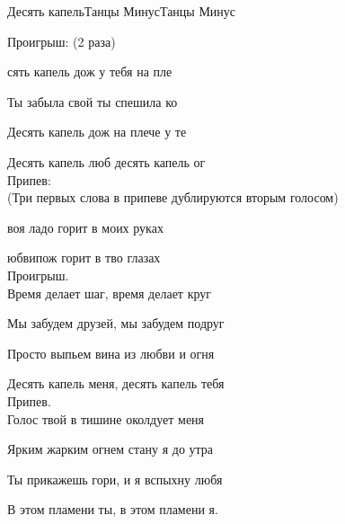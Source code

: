 \documentclass[11pt,a5paper]{book}
\begin{document}
\begin{song}{Десять капель}{}{Танцы Минус}{Танцы Минус}{}{}

Проигрыш: (2 раза)\par 
{}       

сять капель дож у тебя на пле\par
Ты забыла свой  ты спешила ко \par
Десять капель дож на плече у те\par
Десять капель люб десять капель ог\\

Припев:\\(Три первых слова в припеве дублируются вторым голосом)\par
{}воя ладо горит в моих руках\par
{}юбвипож горит в тво глазах\\

Проигрыш.\\

Время делает шаг, время делает круг\par
Мы забудем друзей, мы забудем подруг\par
Просто выпьем вина из любви и огня\par
Десять капель меня, десять капель тебя\\

Припев.\\

Голос твой в тишине околдует меня\par
Ярким жарким огнем стану я до утра\par
Ты прикажешь гори, и я вспыхну любя\par
В этом пламени ты, в этом пламени я.\par

\end{song}
\end{document}
